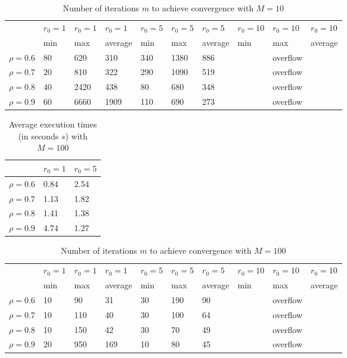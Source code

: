 \documentclass[a4paper,11pt,openright]{report}
\begin{document}
\begin{table}[H]
\centering
\addtolength{\leftskip}{-1.5cm}
\addtolength{\rightskip}{-1.5cm}
\begin{tabular}{|c|lllllllll|}
\hline
$ $ & $r_0 = 1$ & $r_0 = 1$ & $r_0 = 1$ & $r_0 = 5$ & $r_0 = 5$ & $r_0 = 5$ & $r_0 = 10$ & $r_0 = 10$ & $r_0 = 10$  \\
$ $ & min & max & average & min & max & average & min & max & average \\ 
\hline
$\rho = 0.6$ & 80 & 620 & 310 & 340 & 1380 & 886 &  & overflow &  \\

$\rho = 0.7$ & 20 & 810 & 322 & 290 & 1090 & 519 &  & overflow &  \\

$\rho = 0.8$ & 40 & 2420 & 438 & 80 & 680 & 348 &  & overflow & \\

$\rho = 0.9$ & 60 & 6660 & 1909 & 110 & 690 & 273 &  & overflow & \\
\hline
\end{tabular}
\caption{Number of iterations $m$ to achieve convergence with $M = 10$}
\end{table}
\begin{table}[H]
\centering
\addtolength{\leftskip}{-1.5cm}
\addtolength{\rightskip}{-1.5cm}
\begin{tabular}{|c|ll|}
\hline
$ $ & $r_0 = 1$ & $r_0 = 5$ \\
\hline
$\rho = 0.6$ & 0.84 & 2.54  \\

$\rho = 0.7$ & 1.13 & 1.82  \\

$\rho = 0.8$ & 1.41 & 1.38  \\

$\rho = 0.9$ & 4.74 & 1.27  \\
\hline
\end{tabular}
\caption{Average execution
 times (in seconds $s$) with $M = 100$}
\end{table}
\begin{table}[H]
\centering
\addtolength{\leftskip}{-1.5cm}
\addtolength{\rightskip}{-1.5cm}
\begin{tabular}{|c|lllllllll|}
\hline
$ $ & $r_0 = 1$ & $r_0 = 1$ & $r_0 = 1$ & $r_0 = 5$ & $r_0 = 5$ & $r_0 = 5$ & $r_0 = 10$ & $r_0 = 10$ & $r_0 = 10$  \\
$ $ & min & max & average & min & max & average & min & max & average \\ 
\hline
$\rho = 0.6$ & 10 & 90 & 31 & 30 & 190 & 90 &  & overflow &  \\

$\rho = 0.7$ & 10 & 110 & 40 & 30 & 100 & 64 &  & overflow &  \\

$\rho = 0.8$ & 10 & 150 & 42 & 30 & 70 & 49 &  & overflow & \\

$\rho = 0.9$ & 20 & 950 & 169 & 10 & 80 & 45 &  & overflow & \\
\hline
\end{tabular}
\caption{Number of iterations $m$ to achieve convergence with $M = 100$}
\end{table}
\end{document}
